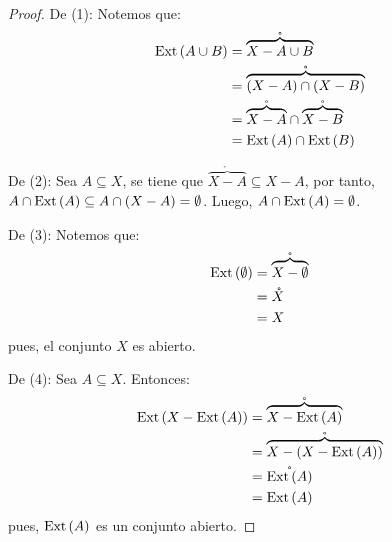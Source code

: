 \documentclass[12pt]{report}
\theoremstyle{largebreak}
\newcommand{\Int}[1]{\ensuremath{\mathring{#1}}}
\newcommand{\Ext}[1]{\ensuremath{\textup{Ext}\left(#1\right)}}
\begin{document}
    \begin{proof}
        De (1): Notemos que:
        \begin{equation*}
            \begin{split}
                \Ext{A\cup B}&=\Int{\overbrace{X-A\cup B}}\\
                &=\Int{\overbrace{(X-A)\cap(X-B)}}\\
                &=\Int{\overbrace{X-A}}\cap\Int{\overbrace{X-B}}\\
                &=\Ext{A}\cap\Ext{B}\\
            \end{split}
        \end{equation*}
        
        De (2): Sea $A\subseteq X$, se tiene que $\Int{\overbrace{X-A}}\subseteq X-A$, por tanto, $A\cap\Ext{A}\subseteq A\cap (X-A)=\emptyset$. Luego, $A\cap\Ext{A}=\emptyset$.

        De (3): Notemos que:
        \begin{equation*}
            \begin{split}
                \Ext{\emptyset}&=\Int{\overbrace{X-\emptyset}}\\
                &=\Int{X}\\
                &=X\\
            \end{split}
        \end{equation*}
        pues, el conjunto $X$ es abierto.

        De (4): Sea $A\subseteq X$. Entonces:
        \begin{equation*}
            \begin{split}
                \Ext{X-\Ext{A}}&=\Int{\overbrace{X-\Ext{A}}}\\
                &=\Int{\overbrace{X-(X-\Ext{A})}}\\
                &=\Int{\Ext{A}}\\
                &=\Ext{A}\\
            \end{split}
        \end{equation*}
        pues, $\Ext{A}$ es un conjunto abierto.
    \end{proof}

    \begin{excer}
        
    \end{excer}

    \begin{excer}
        
    \end{excer}
\end{document}
